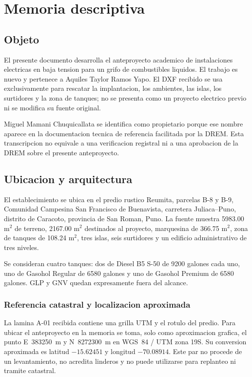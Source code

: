 \chapter{Memoria descriptiva}
\thispagestyle{memoria}\pagestyle{memoria}

\section{Objeto}
El presente documento desarrolla el anteproyecto academico de instalaciones electricas en baja tension para un grifo de combustibles liquidos. El trabajo es nuevo y pertenece a Aquiles Taylor Ramos Yapo. El DXF recibido se usa exclusivamente para rescatar la implantacion, los ambientes, las islas, los surtidores y la zona de tanques; no se presenta como un proyecto electrico previo ni se modifica su fuente original.

Miguel Mamani Chuquicallata se identifica como propietario porque ese nombre aparece en la documentacion tecnica de referencia facilitada por la DREM. Esta transcripcion no equivale a una verificacion registral ni a una aprobacion de la DREM sobre el presente anteproyecto.

\section{Ubicacion y arquitectura}
El establecimiento se ubica en el predio rustico Reumita, parcelas B-8 y B-9, Comunidad Campesina San Francisco de Buenavista, carretera Juliaca--Puno, distrito de Caracoto, provincia de San Roman, Puno. La fuente muestra 5983.00 m\(^2\) de terreno, 2167.00 m\(^2\) destinados al proyecto, marquesina de 366.75 m\(^2\), zona de tanques de 108.24 m\(^2\), tres islas, seis surtidores y un edificio administrativo de tres niveles.

Se consideran cuatro tanques: dos de Diesel B5 S-50 de 9200 galones cada uno, uno de Gasohol Regular de 6580 galones y uno de Gasohol Premium de 6580 galones. GLP y GNV quedan expresamente fuera del alcance.

\subsection{Referencia catastral y localizacion aproximada}
La lamina A-01 recibida contiene una grilla UTM y el rotulo del predio. Para ubicar el anteproyecto en la memoria se toma, solo como aproximacion grafica, el punto E~383250~m y N~8272300~m en WGS~84 / UTM zona 19S. Su conversion aproximada es latitud $-15.62451$ y longitud $-70.08914$. Este par no procede de un levantamiento, no acredita linderos y no puede utilizarse para replanteo ni tramite catastral.

